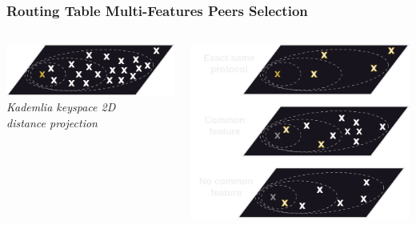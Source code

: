 \documentclass{../pl-slide}
\begin{document}
\begin{frame}
\frametitle{Routing Table Multi-Features Peers Selection}
\begin{columns}[onlytextwidth]
	\begin{column}{0.49\textwidth}
	    		\begin{center}
        		\includegraphics[scale=.35]{resources/1-plan-buckets.png}\\
        		\medskip
        		\textit{Kademlia keyspace 2D\\distance projection}
        		\end{center}
	\end{column}
	\begin{column}{0.49\textwidth}
    		\begin{center}
        		\includegraphics[scale=.26]{resources/dimensions-rt.png}
    		\end{center}
	\end{column}

\end{columns}
\end{frame}
\end{document}

